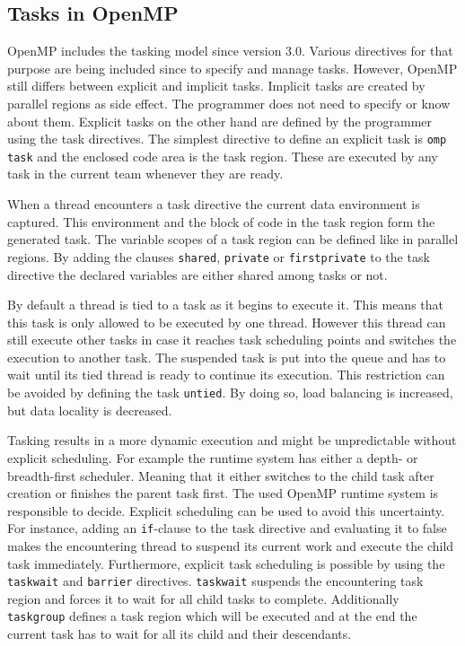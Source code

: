 \subsection{Tasks in OpenMP}
\label{subsec:OpenMP}
  OpenMP includes the tasking model since version 3.0.
  Various directives for that purpose are being included since to specify and manage  tasks.
  However, OpenMP still differs between explicit and implicit tasks.
  Implicit tasks are created by parallel regions as side effect.
  The programmer does not need to specify or know about them.
  Explicit tasks on the other hand are defined by the programmer using the task directives.
  The simplest directive to define an explicit task is \texttt{omp task} and the enclosed code area is the task region.
  These are executed by any task in the current team whenever they are ready.~\cite{Ayguade.2009}~\cite{LaGrone.2011}


  When a thread encounters a task directive the current data environment is captured.
  This environment and the block of code in the task region form the generated task.
  The variable scopes of a task region can be defined like in parallel regions.
  By adding the clauses \texttt{shared}, \texttt{private} or \texttt{firstprivate} to the task directive the declared variables are either shared among tasks or not.~\cite{Duran.2008}
  
  
  By default a thread is tied to a task as it begins to execute it.
  This means that this task is only allowed to be executed by one thread.
  However this thread can still execute other tasks in case it reaches task scheduling points and switches the execution to another task.
  The suspended task is put into the queue and has to wait until its tied thread is ready to continue its execution.
  This restriction can be avoided by defining the task \texttt{untied}.
  By doing so, load balancing is increased, but data locality is decreased.~\cite{Ayguade.2009}~\cite{LaGrone.2011}


  Tasking results in a more dynamic execution and might be unpredictable without explicit scheduling.
  For example the runtime system has either a depth- or breadth-first scheduler.
  Meaning that it either switches to the child task after creation or finishes the parent task first.
  The used OpenMP runtime system is responsible to decide.
  Explicit scheduling can be used to avoid this uncertainty.
  For instance, adding an \texttt{if}-clause to the task directive and evaluating it to false makes the encountering thread to suspend its current work and execute the child task immediately.
  Furthermore, explicit task scheduling is possible by using the \texttt{taskwait} and \texttt{barrier} directives.
  \texttt{taskwait} suspends the encountering task region and forces it to wait for all child tasks to complete.
  Additionally \texttt{taskgroup} defines a task region which will be executed and at the end the current task has to wait for all its child and their descendants.~\cite{Qawasmeh.2014}~\cite{Furlinger.2009}


